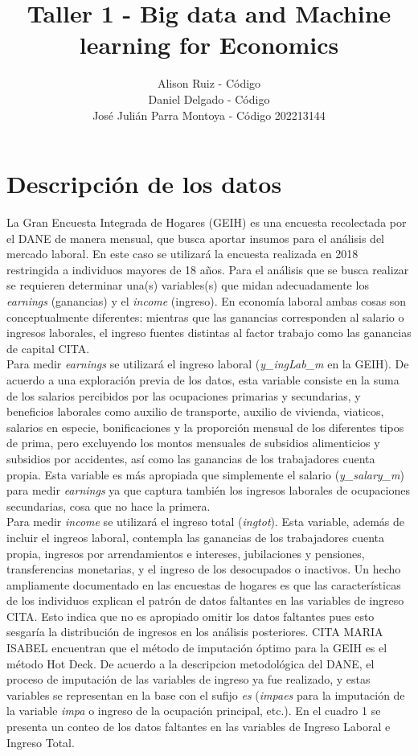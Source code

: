 \documentclass[11pt,a4paper]{article}
\title{Taller 1 - Big data and Machine learning for Economics}
\author{Alison Ruiz - Código\\ 
Daniel Delgado - Código\\
José Julián Parra Montoya - Código 202213144 }
\date{}
\begin{document}
\maketitle

\section{Descripción de los datos}

La Gran Encuesta Integrada de Hogares (GEIH) es una encuesta recolectada por el DANE de manera mensual, que busca aportar insumos para el análisis del mercado laboral.
En este caso se utilizará la encuesta realizada en 2018 restringida a individuos mayores de 18 años. Para el análisis que se busca realizar se requieren determinar una(s) variables(s) que midan adecuadamente los \emph{earnings} (ganancias) y el \emph{income} (ingreso). En economía laboral ambas cosas son conceptualmente diferentes:
mientras que las ganancias corresponden al salario o ingresos laborales, el ingreso fuentes distintas al factor trabajo como
las ganancias de capital CITA.\\
Para medir \emph{earnings} se utilizará el ingreso laboral (\emph{y\_ingLab\_m} en la GEIH). De acuerdo a una exploración previa de los datos, esta variable consiste en la suma de los salarios 
percibidos por las ocupaciones primarias y secundarias, y beneficios laborales como auxilio de transporte, auxilio de vivienda, viaticos, salarios en especie, bonificaciones y la proporción mensual de los diferentes tipos de prima, pero excluyendo
los montos mensuales de subsidios alimenticios y subsidios por accidentes, así como las ganancias de los trabajadores cuenta propia. Esta variable es más apropiada que simplemente el salario (\emph{y\_salary\_m}) para medir \emph{earnings} ya que captura
también los ingresos laborales de ocupaciones secundarias, cosa que no hace la primera.\\
Para medir \emph{income} se utilizará el ingreso total (\emph{ingtot}). Esta variable, además de incluir el ingreos laboral, contempla las ganancias de los trabajadores cuenta propia, ingresos por arrendamientos e intereses, jubilaciones y pensiones, 
transferencias monetarias, y el ingreso de los desocupados o inactivos. 
Un hecho ampliamente documentado en las encuestas de hogares es que las características de los individuos explican el patrón de datos faltantes en las variables de ingreso CITA. Esto indica que no es apropiado omitir los datos faltantes pues esto sesgaría la distribución
de ingresos en los análisis posteriores. CITA MARIA ISABEL encuentran que el método de imputación óptimo para la GEIH es el método Hot Deck. De acuerdo a la descripcion metodológica del DANE, el proceso de imputación de las variables de ingreso ya fue realizado, y estas variables
se representan en la base con el sufijo \emph{es} (\emph{impaes} para la imputación de la variable \emph{impa} o ingreso de la ocupación principal, etc.). En el cuadro 1 se presenta un conteo de los datos faltantes en las variables de Ingreso Laboral e Ingreso Total.
\end{document}
